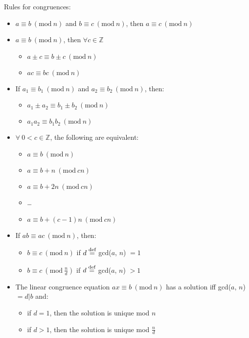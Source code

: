 \documentclass{article}
\newcommand{\congr}[3]{
  #1 \equiv #2\ (\textrm{mod}\ #3)
}
\begin{document}
  Rules for congruences:
  \begin{itemize}
    \item $\congr{a}{b}{n}$ and $\congr{b}{c}{n}$, then $\congr{a}{c}{n}$

    \item
      $\congr{a}{b}{n}$, then $\forall c \in \mathbb{Z}$
      \begin{itemize}
        \item $\congr{a \pm c}{b \pm c}{n}$
        \item $\congr{a c}{b c}{n}$
      \end{itemize}

    \item
      If $\congr{a_1}{b_1}{n}$ and $\congr{a_2}{b_2}{n}$, then:
      \begin{itemize}
        \item $\congr{a_1 \pm a_2}{b_1 \pm b_2}{n}$
        \item $\congr{a_1 a_2}{b_1 b_2}{n}$
      \end{itemize}

    \item
      $\forall\ 0 < c \in \mathbb{Z}$, the following are equivalent:
      \begin{itemize}
        \item $\congr{a}{b}{n}$
        \item $\congr{a}{b + n}{cn}$
        \item $\congr{a}{b + 2n}{cn}$
        \item \dots
        \item $\congr{a}{b + (c-1)n}{cn}$
      \end{itemize}

    \item
      If $\congr{ab}{ac}{n}$, then:
      \begin{itemize}
        \item $\congr{b}{c}{n}$ if $d\stackrel{\text{def}}{=}$ gcd($a$, $n$) $= 1$
        \item $\congr{b}{c}{\frac{n}{d}}$ if $d\stackrel{\text{def}}{=}$ gcd($a$, $n$) $> 1$
      \end{itemize}

    \item
      The linear congruence equation $\congr{ax}{b}{n}$ has a solution iff gcd($a$, $n$) $ = d | b$ and:
      \begin{itemize}
        \item if $d=1$, then the solution is unique mod $n$
        \item if $d>1$, then the solution is unique mod $\frac{n}{d}$
      \end{itemize}
  \end{itemize}
\end{document}
